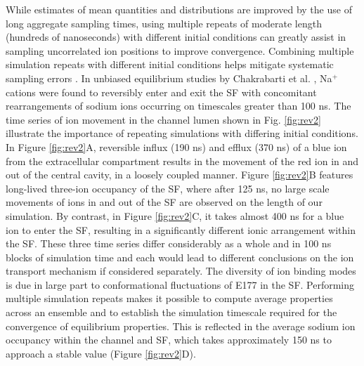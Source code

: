 \begin{refsection}
While estimates of mean quantities and distributions are improved by the use of long aggregate sampling times, using multiple repeats of moderate length (hundreds of nanoseconds) with different initial conditions can greatly assist in sampling uncorrelated ion positions to improve convergence.  Combining multiple simulation repeats with different initial conditions helps mitigate systematic sampling errors \cite{Neale:2013fw}.  In unbiased equilibrium studies by Chakrabarti et al. \cite{Chakrabarti:2013kd}, Na$^{+}$ cations were found to reversibly enter and exit the SF with concomitant rearrangements of sodium ions occurring on timescales greater than 100 ns.  The time series of ion movement in the channel lumen shown in Fig. \ref{fig:rev2} illustrate the importance of repeating simulations with differing initial conditions.  In Figure \ref{fig:rev2}A, reversible influx (190 ns) and efflux (370 ns) of a blue ion from the extracellular compartment results in the movement of the red ion in and out of the central cavity, in a loosely coupled manner.  Figure \ref{fig:rev2}B features long-lived three-ion occupancy of the SF, where after 125 ns, no large scale movements of ions in and out of the SF are observed on the length of our simulation.  By contrast, in Figure \ref{fig:rev2}C, it takes almost 400 ns for a blue ion to enter the SF, resulting in a significantly different ionic arrangement within the SF.  These three time series differ considerably as a whole and in 100 ns blocks of simulation time and each would lead to different conclusions on the ion transport mechanism if considered separately.  The diversity of ion binding modes is due in large part to conformational fluctuations of E177 in the SF.  Performing multiple simulation repeats makes it possible to compute average properties across an ensemble and to establish the simulation timescale required for the convergence of equilibrium properties.  This is reflected in the average sodium ion occupancy within the channel and SF, which takes approximately 150 ns to approach a stable value (Figure \ref{fig:rev2}D).
 

\end{refsection}
